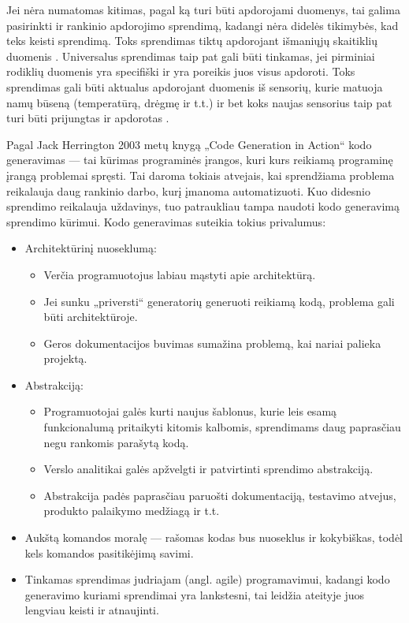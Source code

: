 \documentclass{VUMIFPSbakalaurinis}
\begin{document}
Jei nėra numatomas kitimas, pagal ką turi būti apdorojami duomenys, tai galima pasirinkti ir rankinio apdorojimo sprendimą, kadangi nėra didelės tikimybės, kad teks keisti sprendimą. Toks sprendimas tiktų apdorojant išmaniųjų skaitiklių duomenis \cite{skaitikliai}. Universalus sprendimas taip pat gali būti tinkamas, jei pirminiai rodiklių duomenis yra specifiški ir yra poreikis juos visus apdoroti. Toks sprendimas gali būti aktualus apdorojant duomenis iš sensorių, kurie matuoja namų būseną (temperatūrą, drėgmę ir t.t.) ir bet koks naujas sensorius taip pat turi būti prijungtas ir apdorotas \cite{yang2017iot}. \par
Pagal Jack Herrington 2003 metų knygą „Code Generation in Action“ kodo generavimas — tai kūrimas programinės įrangos, kuri kurs reikiamą programinę įrangą problemai spręsti. Tai daroma tokiais atvejais, kai sprendžiama problema reikalauja daug rankinio darbo, kurį įmanoma automatizuoti. Kuo didesnio sprendimo reikalauja uždavinys, tuo patraukliau tampa naudoti kodo generavimą sprendimo kūrimui. Kodo generavimas suteikia tokius privalumus: 
\begin{itemize}
    \item Architektūrinį nuoseklumą: 
    \begin{itemize}
        \item Verčia programuotojus labiau mąstyti apie architektūrą.
        \item Jei sunku „priversti“ generatorių generuoti reikiamą kodą, problema gali būti architektūroje.
        \item Geros dokumentacijos buvimas sumažina problemą, kai nariai palieka projektą.
    \end{itemize}
    \item Abstrakciją:
    \begin{itemize}
        \item Programuotojai galės kurti naujus šablonus, kurie leis esamą funkcionalumą pritaikyti kitomis kalbomis, sprendimams daug paprasčiau negu rankomis parašytą kodą.
        \item Verslo analitikai galės apžvelgti ir patvirtinti sprendimo abstrakciją.
        \item Abstrakcija padės paprasčiau paruošti dokumentaciją, testavimo atvejus, produkto palaikymo medžiagą ir t.t.  
    \end{itemize}
    \item Aukštą komandos moralę — rašomas kodas bus nuoseklus ir kokybiškas, todėl kels komandos pasitikėjimą savimi.
    \item Tinkamas sprendimas judriajam (angl. agile) programavimui, kadangi kodo generavimo kuriami sprendimai yra lankstesni, tai leidžia ateityje juos lengviau keisti ir atnaujinti.   
\end{itemize} 
\end{document}
